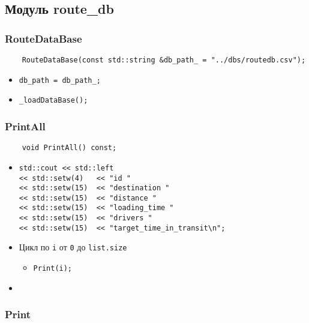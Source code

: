 \subsection{Модуль route\_db}

\subsubsection{RouteDataBase}

\begin{lstlisting}
    RouteDataBase(const std::string &db_path_ = "../dbs/routedb.csv");
\end{lstlisting}

\begin{itemize}
    \item \verb|db_path = db_path_;|
    \item \verb|_loadDataBase();|
\end{itemize}

\subsubsection{PrintAll}

\begin{lstlisting}
    void PrintAll() const;
\end{lstlisting}

\begin{itemize}
    \item \verb|std::cout << std::left|\\
          \verb|<< std::setw(4)   << "id "|\\
          \verb|<< std::setw(15)  << "destination "|\\
          \verb|<< std::setw(15)  << "distance "|\\
          \verb|<< std::setw(15)  << "loading_time "|\\
          \verb|<< std::setw(15)  << "drivers "|\\
          \verb|<< std::setw(15)  << "target_time_in_transit\n";|
    \item Цикл по \verb|i| от \verb|0| до \verb|list.size| 
        \begin{itemize}
            \item \verb|Print(i);|
        \end{itemize}
    \item \verb||
\end{itemize}

\subsubsection{Print}


